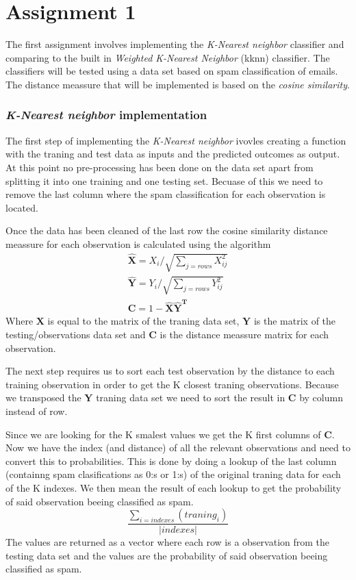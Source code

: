 \documentclass[a4paper,12pt]{article}
\begin{document}
\section{Assignment 1}

The first assignment involves implementing the \textit{K-Nearest neighbor} classifier and comparing to the built in \textit{Weighted K-Nearest Neighbor} (kknn) classifier. The classifiers will be tested using a data set based on spam classification of emails. The distance meassure that will be implemented is based on the \textit{cosine similarity}. 

\subsubsection{\textit{K-Nearest neighbor} implementation}

The first step of implementing the \textit{K-Nearest neighbor} ivovles creating a function with the traning and test data as inputs and the predicted outcomes as output. At this point no pre-processing has been done on the data set apart from splitting it into one training and one testing set. Becuase of this we need to remove the last column where the spam classification for each observation is located. 

Once the data has been cleaned of the last row the cosine similarity distance meassure for each observation is calculated using the algorithm
\begin{align*}
  \widehat{\mathbf{X}} = {X_i}/\sqrt{\sum_{j = rows}{X_{ij}^2}} \\
  \widehat{\mathbf{Y}} = {Y_i}/\sqrt{\sum_{j = rows}{Y_{ij}^2}} \\
  \textbf{C} = 1 - \widehat{\mathbf{X}}\widehat{\mathbf{Y}}^\textbf{T}
  \end{align*}
Where \(\mathbf{X}\) is equal to the matrix of the traning data set, \(\mathbf{Y}\) is the matrix of the testing/observations data set and  \(\mathbf{C}\) is the distance meassure matrix for each observation.

The next step requires us to sort each test observation by the distance to each training observation in order to get the K closest traning observations. Because we transposed the \( \mathbf{Y}\) traning data set we need to sort the result in \(\mathbf{C}\) by column instead of row.

Since we are looking for the K smalest values we get the K first columns of \(\mathbf{C}\). Now we have the index (and distance) of all the relevant observations and need to convert this to probabilities. This is done by doing a lookup of the last column (containng spam clasifications as 0:s or 1:s) of the original traning data for each of the K indexes. We then mean the result of each lookup to get the probability of said observation beeing classified as spam. 
\begin{equation}
  \frac{\sum_{i = indexes}({traning_i})}{\left | indexes \right |}
\end{equation} 
The values are returned as a vector where each row is a observation from the testing data set and the values are the probability of said observation beeing classified as spam.
\end{document}
